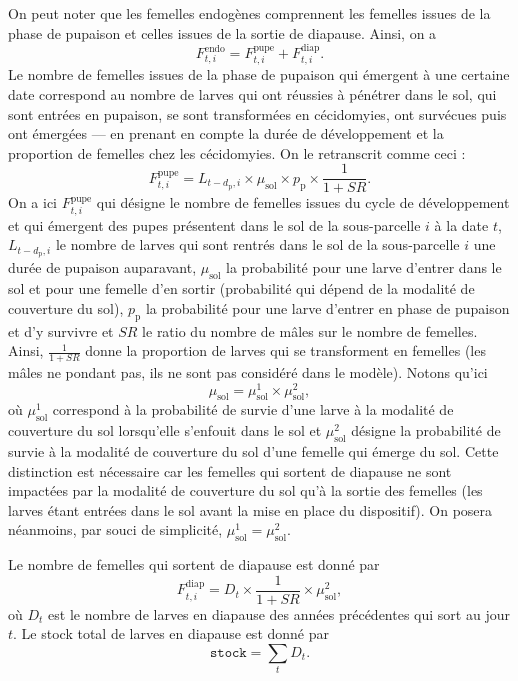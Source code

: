 On peut noter que les femelles endogènes comprennent les femelles issues de la phase de pupaison et celles issues de la sortie de diapause. Ainsi, on a
\[
F^{\text{endo}}_{t, i} = F^{\text{pupe}}_{t, i} + F^{\text{diap}}_{t,i}.
\]
Le nombre de femelles issues de la phase de pupaison qui émergent à une certaine date correspond au nombre de larves qui ont réussies à pénétrer dans le sol, qui sont entrées en pupaison, se sont transformées en cécidomyies, ont survécues puis ont émergées --- en prenant en compte la durée de développement et la proportion de femelles chez les cécidomyies.
On le retranscrit comme ceci :
\[
F^{\text{pupe}}_{t, i} = L_{t - d_{\text{p}}, i} \times \mu_{\text{sol}} \times p_{\text{p}} \times \frac{1}{1 + \mathit{SR}}.
\]
On a ici $F^{\text{pupe}}_{t, i}$ qui désigne le nombre de femelles issues du cycle de développement et qui émergent des pupes présentent dans le sol de la sous-parcelle $i$ à la date $t$, $L_{t - d_{\text{p}}, i}$ le nombre de larves qui sont rentrés dans le sol de la sous-parcelle $i$ une durée de pupaison auparavant, $\mu_{\text{sol}}$ la probabilité pour une larve d'entrer dans le sol et pour une femelle d'en sortir (probabilité qui dépend de la modalité de couverture du sol), $p_{\text{p}}$ la probabilité pour une larve d'entrer en phase de pupaison et d'y survivre et $\mathit{SR}$ le ratio du nombre de mâles sur le nombre de femelles. 
Ainsi, $\frac{1}{1 + \mathit{SR}}$ donne la proportion de larves qui se transforment en femelles (les mâles ne pondant pas, ils ne sont pas considéré dans le modèle).
Notons qu'ici
\[
\mu_{\text{sol}} = \mu_{\text{sol}}^1 \times \mu_{\text{sol}}^2,
\]
où $\mu_{\text{sol}}^1$ correspond à la probabilité de survie d'une larve à la modalité de couverture du sol lorsqu'elle s'enfouit dans le sol et $\mu_{\text{sol}}^2$ désigne la probabilité de survie à la modalité de couverture du sol d'une femelle qui émerge du sol.
Cette distinction est nécessaire car les femelles qui sortent de diapause ne sont impactées par la modalité de couverture du sol qu'à la sortie des femelles (les larves étant entrées dans le sol avant la mise en place du dispositif).
On posera néanmoins, par souci de simplicité, $\mu_{\text{sol}}^1 = \mu_{\text{sol}}^2$.

Le nombre de femelles qui sortent de diapause est donné par 
\[
F_{t, i}^{\text{diap}} = D_{t} \times \frac{1}{1 + \mathit{SR}} \times \mu^{2}_{\text{sol}},
\]
où $D_{t}$ est le nombre de larves en diapause des années précédentes qui sort au jour $t$.
Le stock total de larves en diapause est donné par
\[
\texttt{stock} = \sum_t D_t.
\]



